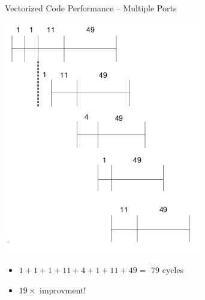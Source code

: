\documentclass[presentation]{beamer}
\begin{document}
\begin{frame}[label={sec:org7c33384}]{Vectorized Code Performance -- Multiple Ports}
\begin{block}{}
\begin{center}
\includegraphics[width=.5\textwidth]{./images/slides_SIMD_40_small.png}
\end{center}
\end{block}

\begin{block}{}
\begin{itemize}
\item \(1+1+1+11+4+1+11+49 =\) \alert{\(79\)} cycles
\item \alert{\(19 \times\)} improvment!
\end{itemize}
\end{block}
\end{frame}
\end{document}
